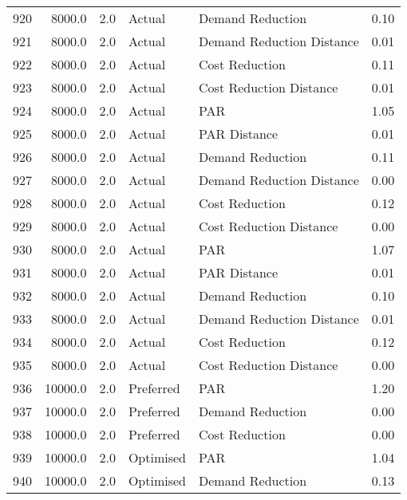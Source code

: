 \begin{longtable}{lrrllr}
920  &       8000.0 &     2.0 &         Actual &           Demand Reduction &   0.10 \\
921  &       8000.0 &     2.0 &         Actual &  Demand Reduction Distance &   0.01 \\
922  &       8000.0 &     2.0 &         Actual &             Cost Reduction &   0.11 \\
923  &       8000.0 &     2.0 &         Actual &    Cost Reduction Distance &   0.01 \\
924  &       8000.0 &     2.0 &         Actual &                        PAR &   1.05 \\
925  &       8000.0 &     2.0 &         Actual &               PAR Distance &   0.01 \\
926  &       8000.0 &     2.0 &         Actual &           Demand Reduction &   0.11 \\
927  &       8000.0 &     2.0 &         Actual &  Demand Reduction Distance &   0.00 \\
928  &       8000.0 &     2.0 &         Actual &             Cost Reduction &   0.12 \\
929  &       8000.0 &     2.0 &         Actual &    Cost Reduction Distance &   0.00 \\
930  &       8000.0 &     2.0 &         Actual &                        PAR &   1.07 \\
931  &       8000.0 &     2.0 &         Actual &               PAR Distance &   0.01 \\
932  &       8000.0 &     2.0 &         Actual &           Demand Reduction &   0.10 \\
933  &       8000.0 &     2.0 &         Actual &  Demand Reduction Distance &   0.01 \\
934  &       8000.0 &     2.0 &         Actual &             Cost Reduction &   0.12 \\
935  &       8000.0 &     2.0 &         Actual &    Cost Reduction Distance &   0.00 \\
936  &      10000.0 &     2.0 &      Preferred &                        PAR &   1.20 \\
937  &      10000.0 &     2.0 &      Preferred &           Demand Reduction &   0.00 \\
938  &      10000.0 &     2.0 &      Preferred &             Cost Reduction &   0.00 \\
939  &      10000.0 &     2.0 &      Optimised &                        PAR &   1.04 \\
940  &      10000.0 &     2.0 &      Optimised &           Demand Reduction &   0.13 \\

\end{longtable}
